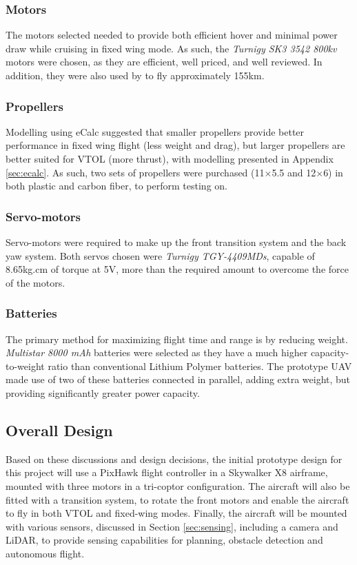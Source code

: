 \subsubsection*{Motors}
The motors selected needed to provide both efficient hover and minimal power draw while cruising in fixed wing mode. As such, the \textit{Turnigy SK3 3542 800kv} motors were chosen, as they are efficient, well priced, and well reviewed. In addition, they were also used by \cite{ref:fireflyinstruction} to fly approximately 155km.
	
\subsubsection*{Propellers}
Modelling using eCalc suggested that smaller propellers provide better performance in fixed wing flight (less weight and drag), but larger propellers are better suited for VTOL (more thrust), with modelling presented in Appendix \ref{sec:ecalc}. As such, two sets of propellers were purchased (11$\times$5.5 and 12$\times$6) in both plastic and carbon fiber, to perform testing on.
	
\subsubsection*{Servo-motors}
Servo-motors were required to make up the front transition system and the back yaw system. Both servos chosen were \textit{Turnigy TGY-4409MDs}, capable of 8.65kg.cm of torque at 5V, more than the required amount to overcome the force of the motors. 
		
\subsubsection*{Batteries}
The primary method for maximizing flight time and range is by reducing weight. \textit{Multistar 8000 mAh} batteries were selected as they have a much higher capacity-to-weight ratio than conventional Lithium Polymer batteries. The prototype UAV made use of two of these batteries connected in parallel, adding extra weight, but providing significantly greater power capacity.

\subsection{Overall Design}
Based on these discussions and design decisions, the initial prototype design for this project will use a PixHawk flight controller in a Skywalker X8 airframe, mounted with three motors in a tri-coptor configuration. The aircraft will also be fitted with a transition system, to rotate the front motors and enable the aircraft to fly in both VTOL and fixed-wing modes. Finally, the aircraft will be mounted with various sensors, discussed in Section \ref{sec:sensing}, including a camera and LiDAR, to provide sensing capabilities for planning, obstacle detection and autonomous flight.\\

